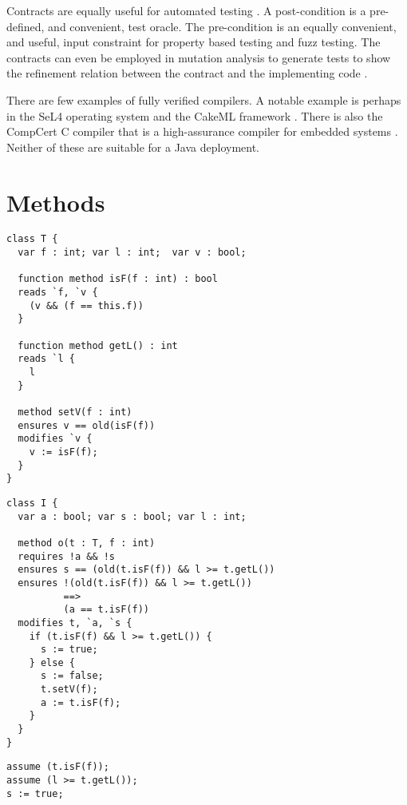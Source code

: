 \documentclass[11pt,onecolumn,notitlepage]{article}
\begin{document}
Contracts are equally useful for automated testing \cite{10.1007/978-3-540-69507-3_9, Ciupa05automatictesting, 8471992, 8972014}. A post-condition is a pre-defined, and convenient, test oracle. The pre-condition is an equally convenient, and useful, input constraint for property based testing and fuzz testing. The contracts can even be employed in mutation analysis to generate tests to show the refinement relation between the contract and the implementing code \cite{KRENN200971}. 

There are few examples of fully verified compilers. A notable example is perhaps in the SeL4 operating system and the CakeML framework \cite{10.1145/1631687.1596566,ESOP18}. There is also the CompCert C compiler that is a high-assurance compiler for embedded systems \cite{Leroy-backend,2008-Leroy-Blazy-memory-model}. Neither of these are suitable for a Java deployment.

\section*{Methods}

\newsavebox{\boxT}
\begin{lrbox}{\boxT}
\begin{lstlisting}
class T {
  var f : int; var l : int;  var v : bool;

  function method isF(f : int) : bool
  reads `f, `v { 
    (v && (f == this.f))
  }

  function method getL() : int
  reads `l { 
    l
  }

  method setV(f : int)
  ensures v == old(isF(f))
  modifies `v {
    v := isF(f);
  }
}
\end{lstlisting}
\end{lrbox}

\newsavebox{\boxI}
\begin{lrbox}{\boxI}
\begin{lstlisting}
class I {
  var a : bool; var s : bool; var l : int;

  method o(t : T, f : int)
  requires !a && !s
  ensures s == (old(t.isF(f)) && l >= t.getL())
  ensures !(old(t.isF(f)) && l >= t.getL()) 
          ==> 
          (a == t.isF(f))
  modifies t, `a, `s {
    if (t.isF(f) && l >= t.getL()) {
      s := true;
    } else {
      s := false;
      t.setV(f);
      a := t.isF(f);
    }
  }
}
\end{lstlisting}
\end{lrbox}

\newsavebox{\boxa}
\begin{lrbox}{\boxa}
\begin{lstlisting}
assume (t.isF(f));
assume (l >= t.getL());
s := true;
\end{lstlisting}
\end{lrbox}
\end{document}
